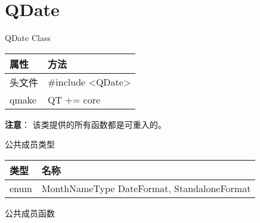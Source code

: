 \chapter{QDate}

QDate Class

\begin{tabular}{|l|l|}
\hline
属性&	方法\\
\hline
头文件&	\#include <QDate>\\
\hline
qmake&	QT += core\\
\hline
\end{tabular}

\textbf{注意}： 该类提供的所有函数都是可重入的。

\splitLine

公共成员类型

\begin{tabular}{|l|l|}
\hline
类型&	名称\\
\hline
enum&	MonthNameType{ DateFormat, StandaloneFormat }\\
\hline
\end{tabular}

\splitLine

公共成员函数

